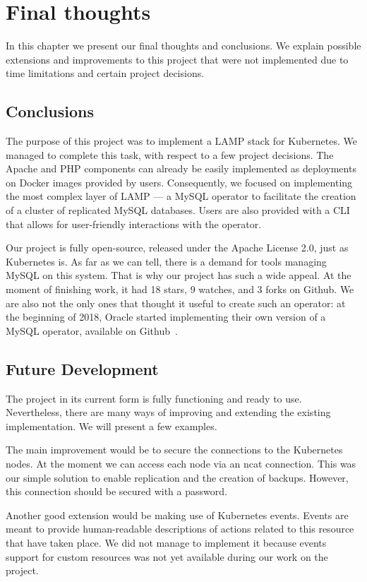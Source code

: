 \chapter{Final thoughts}
In this chapter we present our final thoughts and conclusions. We explain possible extensions
and improvements to this project that were not implemented due to time limitations and certain
project decisions.

\section{Conclusions}
The purpose of this project was to implement a LAMP stack for Kubernetes. We managed to complete
this task, with respect to a few project decisions. The Apache and PHP
components can already be easily implemented as
deployments on Docker images provided by users. Consequently, we focused on implementing the most
complex layer of LAMP --- a MySQL operator to facilitate the creation of a cluster of replicated
MySQL databases. Users are also provided with a CLI that allows for user-friendly interactions with
the operator.

Our project is fully open-source, released under the Apache License 2.0, just as Kubernetes is. As
far as we can tell, there is a demand for tools managing MySQL on this system. That is why our
project has such a wide appeal. At the moment of finishing work, it had 18 stars, 9 watches, and 3
forks on Github. We are also not the only ones that thought it useful to create
such an operator: at the beginning of 2018, Oracle started implementing their
own version of a MySQL operator, available on Github~\cite{oracle}.

\section{Future Development}
The project in its current form is fully functioning and ready to use. Nevertheless, there are many
ways of improving and extending the existing implementation. We will present a few examples.

The main improvement would be to secure the connections to the Kubernetes nodes. At the moment we
can access each node via an ncat connection. This was our simple solution to enable replication and
the creation of backups. However, this connection should be secured with a password.

Another good extension would be making use of Kubernetes events. Events are meant to provide
human-readable descriptions of actions related to this resource that have taken place. We did not
manage to implement it because events support for custom resources was not yet available during our
work on the project.

